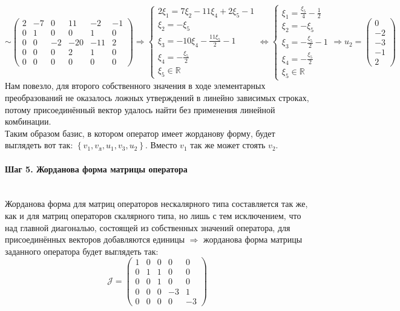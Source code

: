 \documentclass{article}
\begin{document}
$$\sim \left(\begin{array}{ccccc|c}
2 & -7 & 0 & 11 & -2 & -1 \\
0 & 1 & 0 & 0 & 1 & 0 \\
0 & 0 & -2 & -20 & -11 & 2 \\
0 & 0 & 0 & 2 & 1 & 0 \\
0 & 0 & 0 & 0 & 0 & 0
\end{array}\right) \Rightarrow \begin{cases}
2\xi_1=7\xi_2-11\xi_4+2\xi_5-1 \\
\xi_2 = -\xi_5 \\
\xi_3 = -10\xi_4-\frac{11\xi_5}{2}-1 \\
\xi_4 = -\frac{\xi_5}{2} \\
\xi_5 \in \mathbb{R}
\end{cases} \Leftrightarrow \begin{cases}
\xi_1=\frac{\xi_5}{4}-\frac{1}{2} \\
\xi_2 = -\xi_5 \\
\xi_3 = -\frac{\xi_5}{2}-1 \\
\xi_4 = -\frac{\xi_5}{2} \\
\xi_5 \in \mathbb{R}
\end{cases} \Rightarrow u_2 = \begin{pmatrix}0 \\ -2 \\ -3 \\ -1 \\ 2\end{pmatrix}$$
Нам повезло, для второго собственного значения в ходе элементарных преобразований не оказалось ложных утверждений в линейно зависимых строках, потому присоединённый вектор удалось найти без применения линейной комбинации. \\

\noindent Таким образом базис, в котором оператор имеет жорданову форму, будет выглядеть вот так: $\left\{v_1, v_л, u_1, v_3, u_2\right\}$. Вместо $v_1$ так же может стоять $v_2$.

\paragraph*{Шаг 5. Жорданова форма матрицы оператора} \, \\
Жорданова форма для матриц операторов нескалярного типа составляется так же, как и для матриц операторов скалярного типа, но лишь с тем исключением, что над главной диагональю, состоящей из собственных значений оператора, для присоединённых векторов добавляются единицы $\Rightarrow$ жорданова форма матрицы заданного оператора будет выглядеть так:
$$\mathcal{J} = \begin{pmatrix}
1 & 0 & 0 & 0 & 0 \\
0 & 1 & 1 & 0 & 0 \\
0 & 0 & 1 & 0 & 0 \\
0 & 0 & 0 & -3 & 1 \\
0 & 0 & 0 & 0 & -3
\end{pmatrix}$$
\end{document}
